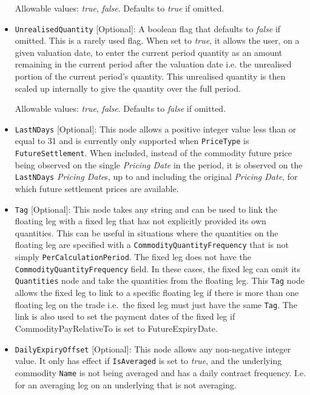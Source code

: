 \begin{itemize}
Allowable values: \emph{true}, \emph{false}. Defaults to \emph{true} if omitted.

\item
\lstinline!UnrealisedQuantity! [Optional]: A boolean flag that defaults to \emph{false} if omitted. This is a rarely used flag. When set to \emph{true}, it allows the user, on a given valuation date, to enter the current period quantity as an amount remaining in the current period after the valuation date i.e. the unrealised portion of the current period's quantity. This unrealised quantity is then scaled up internally to give the quantity over the full period.

Allowable values: \emph{true}, \emph{false}. Defaults to \emph{false} if omitted.

\item
\lstinline!LastNDays! [Optional]: This node allows a positive integer value less than or equal to 31 and is currently only supported when \lstinline!PriceType! is \lstinline!FutureSettlement!. When included, instead of the commodity future price being observed on the single \textit{Pricing Date} in the period, it is observed on the \lstinline!LastNDays! \textit{Pricing Date}s, up to and including the original \textit{Pricing Date}, for which future settlement prices are available.

\item
\lstinline!Tag! [Optional]: This node takes any string and can be used to link the floating leg with a fixed leg that has not explicitly provided its own quantities. This can be useful in situations where the quantities on the floating leg are specified with a \lstinline!CommodityQuantityFrequency! that is not simply \lstinline!PerCalculationPeriod!. The fixed leg does not have the \lstinline!CommodityQuantityFrequency! field. In these cases, the fixed leg can omit its \lstinline!Quantities! node and take the quantities from the floating leg. This \lstinline!Tag! node allows the fixed leg to link to a specific floating leg if there is more than one floating leg on the trade i.e.\ the fixed leg must just have the same \lstinline!Tag!. The link is also used to set the payment dates of the fixed leg if CommodityPayRelativeTo is set to FutureExpiryDate.

\item
\lstinline!DailyExpiryOffset! [Optional]: This node allows any non-negative integer value. It only has effect if \lstinline!IsAveraged!  is set to \emph{true}, and the underlying commodity \lstinline!Name! is not being averaged and has a daily contract frequency.  I.e. for an averaging leg on an underlying that is not averaging. 


\end{itemize}
